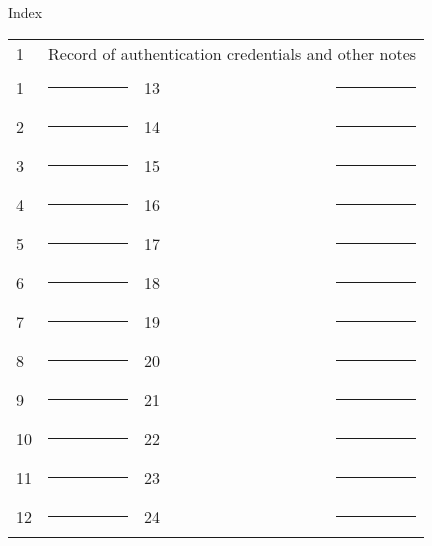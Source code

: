 \newpage

\begin{center}
{\large
Index \vspace{.5in}
}

\begin{tabular}{l l l l }
	1 & \multicolumn{3}{l}{Record of authentication credentials and other notes} \vspace{.225in} \\
	1 & \rule{1.75in}{.2pt} & 13 & \rule{1.75in}{.2pt} \vspace{.225in} \\
	2 & \rule{1.75in}{.2pt} & 14 & \rule{1.75in}{.2pt} \vspace{.225in} \\
	3 & \rule{1.75in}{.2pt} & 15 & \rule{1.75in}{.2pt} \vspace{.225in} \\
	4 & \rule{1.75in}{.2pt} & 16 & \rule{1.75in}{.2pt} \vspace{.225in} \\
	5 & \rule{1.75in}{.2pt} & 17 & \rule{1.75in}{.2pt} \vspace{.225in} \\
	6 & \rule{1.75in}{.2pt} & 18 & \rule{1.75in}{.2pt} \vspace{.225in} \\
	7 & \rule{1.75in}{.2pt} & 19 & \rule{1.75in}{.2pt} \vspace{.225in} \\
	8 & \rule{1.75in}{.2pt} & 20 & \rule{1.75in}{.2pt} \vspace{.225in} \\
	9 & \rule{1.75in}{.2pt} & 21 & \rule{1.75in}{.2pt} \vspace{.225in} \\
	10 & \rule{1.75in}{.2pt} & 22 & \rule{1.75in}{.2pt} \vspace{.225in} \\
	11 & \rule{1.75in}{.2pt} & 23 & \rule{1.75in}{.2pt} \vspace{.225in} \\
	12 & \rule{1.75in}{.2pt} & 24 & \rule{1.75in}{.2pt} \vspace{.225in} \\
\end{tabular}

\end{center}

\newpage

